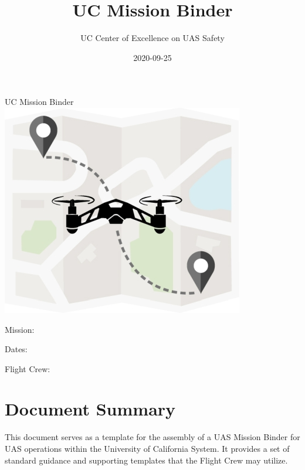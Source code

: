 \documentclass[
]{book}
\title{UC Mission Binder}
\author{UC Center of Excellence on UAS Safety}
\date{2020-09-25}
\let\oldmaketitle\maketitle
\begin{document}
\maketitle

\thispagestyle{empty}
\begin{center}
\vspace*{9em}
{\Huge UC Mission Binder}\\
\vspace*{9em}
\includegraphics{cover.jpg}\\
\vspace*{9em}
{\huge 

Mission: \hrulefill

Dates: \hrulefill

Flight Crew: \hrulefill

}
\vspace*{9em}
\end{center}

\let\maketitle\oldmaketitle

{
\setcounter{tocdepth}{1}
\tableofcontents
}
\hypertarget{document-summary}{%
\chapter*{Document Summary}\label{document-summary}}

This document serves as a template for the assembly of a UAS Mission Binder for UAS operations within the University of California System. It provides a set of standard guidance and supporting templates that the Flight Crew may utilize.
\end{document}
